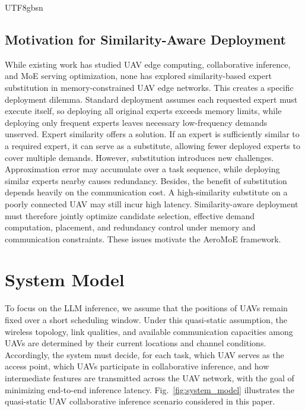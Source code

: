 \documentclass[journal]{IEEEtran}
\begin{document}
\begin{CJK*}{UTF8}{gbsn}
\subsection{Motivation for Similarity-Aware Deployment}
While existing work has studied UAV edge computing, collaborative inference, and MoE serving optimization, none has explored similarity-based expert substitution in memory-constrained UAV edge networks. This creates a specific deployment dilemma. Standard deployment assumes each requested expert must execute itself, so deploying all original experts exceeds memory limits, while deploying only frequent experts leaves necessary low-frequency demands unserved. Expert similarity offers a solution. If an expert is sufficiently similar to a required expert, it can serve as a substitute, allowing fewer deployed experts to cover multiple demands{\color{black}\cite{R26}}. However, substitution introduces new challenges. Approximation error may accumulate over a task sequence, while deploying similar experts nearby causes redundancy. Besides, the benefit of substitution depends heavily on the communication cost. A high-similarity substitute on a poorly connected UAV may still incur high latency. Similarity-aware deployment must therefore jointly optimize candidate selection, effective demand computation, placement, and redundancy control under memory and communication constraints. These issues motivate the AeroMoE framework.


\section{System Model}
\label{sec:system}

To focus on the LLM inference, we assume that the positions of UAVs remain fixed over a short scheduling window. Under this quasi-static assumption, the wireless topology, link qualities, and available communication capacities among UAVs are determined by their current locations and channel conditions. Accordingly, the system must decide, for each task, which UAV serves as the access point, which UAVs participate in collaborative inference, and how intermediate features are transmitted across the UAV network, with the goal of minimizing end-to-end inference latency. Fig.~\ref{fig:system_model} illustrates the quasi-static UAV collaborative inference scenario considered in this paper.


\end{CJK*}
\end{document}
